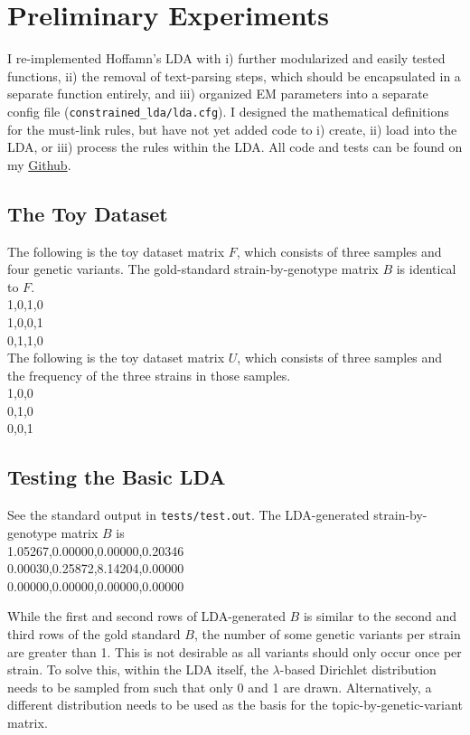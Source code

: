 \documentclass{article}
\newcommand{\code}[1]{\texttt{#1}}
\begin{document}
\section{Preliminary Experiments} \label{Results}

I re-implemented Hoffamn's LDA with i) further modularized and easily tested functions, ii) the removal of text-parsing steps, which should be encapsulated in a separate function entirely, and iii) organized EM parameters into a separate config file (\code{constrained\_lda/lda.cfg}). I designed the mathematical definitions for the must-link rules, but have not yet added code to i) create, ii) load into the LDA, or iii) process the rules within the LDA. All code and tests can be found on my
\href{https://github.com/lauren-mak/constrained_lda}{Github}. 

\subsection{The Toy Dataset}

The following is the toy dataset matrix $F$, which consists of three samples and four genetic variants. The gold-standard strain-by-genotype matrix $B$ is identical to $F$. \\
1,0,1,0 \\
1,0,0,1 \\
0,1,1,0 \\
The following is the toy dataset matrix $U$, which consists of three samples and the frequency of the three strains in those samples. \\
1,0,0 \\
0,1,0 \\
0,0,1

\subsection{Testing the Basic LDA}

See the standard output in \code{tests/test.out}. The LDA-generated strain-by-genotype matrix $B$ is \\
1.05267,0.00000,0.00000,0.20346 \\
0.00030,0.25872,8.14204,0.00000 \\
0.00000,0.00000,0.00000,0.00000

While the first and second rows of LDA-generated $B$ is similar to the second and third rows of the gold standard $B$, the number of some genetic variants per strain are greater than 1. This is not desirable as all variants should only occur once per strain. To solve this, within the LDA itself, the $\lambda$-based Dirichlet distribution needs to be sampled from such that only 0 and 1 are drawn. Alternatively, a different distribution needs to be used as the basis for the topic-by-genetic-variant matrix. 
\end{document}

